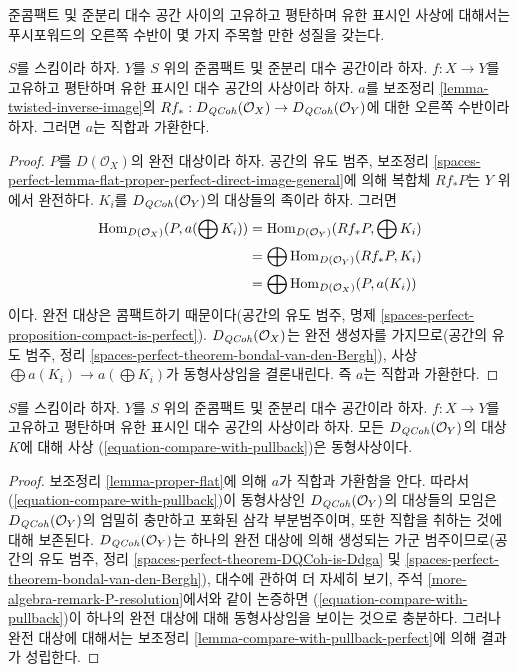 \noindent
준콤팩트 및 준분리 대수 공간 사이의 고유하고 평탄하며 유한 표시인
사상에 대해서는 푸시포워드의 오른쪽 수반이 몇 가지 주목할 만한
성질을 갖는다.

\begin{lemma}
\label{lemma-proper-flat}
$S$를 스킴이라 하자.
$Y$를 $S$ 위의 준콤팩트 및 준분리 대수 공간이라 하자.
$f : X \to Y$를 고유하고 평탄하며 유한 표시인 대수 공간의 사상이라
하자. $a$를 보조정리 \ref{lemma-twisted-inverse-image}의
$Rf_* : D_{\mathit{QCoh}}(\mathcal{O}_X) \to D_{\mathit{QCoh}}(\mathcal{O}_Y)$에 대한
오른쪽 수반이라 하자. 그러면 $a$는 직합과 가환한다.
\end{lemma}

\begin{proof}
$P$를 $D(\mathcal{O}_X)$의 완전 대상이라 하자.
공간의 유도 범주, 보조정리
\ref{spaces-perfect-lemma-flat-proper-perfect-direct-image-general}에
의해 복합체 $Rf_*P$는 $Y$ 위에서 완전하다.
$K_i$를 $D_{\mathit{QCoh}}(\mathcal{O}_Y)$의 대상들의 족이라 하자. 그러면
\begin{align*}
\mathop{\mathrm{Hom}}\nolimits_{D(\mathcal{O}_X)}(P, a(\bigoplus K_i))
& =
\mathop{\mathrm{Hom}}\nolimits_{D(\mathcal{O}_Y)}(Rf_*P, \bigoplus K_i) \\
& =
\bigoplus \mathop{\mathrm{Hom}}\nolimits_{D(\mathcal{O}_Y)}(Rf_*P, K_i) \\
& =
\bigoplus \mathop{\mathrm{Hom}}\nolimits_{D(\mathcal{O}_X)}(P, a(K_i))
\end{align*}
이다. 완전 대상은 콤팩트하기 때문이다(공간의 유도 범주, 명제
\ref{spaces-perfect-proposition-compact-is-perfect}).
$D_{\mathit{QCoh}}(\mathcal{O}_X)$는 완전 생성자를 가지므로(공간의 유도 범주,
정리 \ref{spaces-perfect-theorem-bondal-van-den-Bergh}), 사상
$\bigoplus a(K_i) \to a(\bigoplus K_i)$가 동형사상임을 결론내린다.
즉 $a$는 직합과 가환한다.
\end{proof}

\begin{lemma}
\label{lemma-compare-with-pullback-flat-proper}
$S$를 스킴이라 하자.
$Y$를 $S$ 위의 준콤팩트 및 준분리 대수 공간이라 하자.
$f : X \to Y$를 고유하고 평탄하며 유한 표시인 대수 공간의 사상이라
하자. 모든 $D_{\mathit{QCoh}}(\mathcal{O}_Y)$의 대상 $K$에 대해 사상
(\ref{equation-compare-with-pullback})은 동형사상이다.
\end{lemma}

\begin{proof}
보조정리 \ref{lemma-proper-flat}에 의해 $a$가 직합과 가환함을 안다.
따라서 (\ref{equation-compare-with-pullback})이 동형사상인
$D_{\mathit{QCoh}}(\mathcal{O}_Y)$의 대상들의 모임은
$D_{\mathit{QCoh}}(\mathcal{O}_Y)$의 엄밀히 충만하고 포화된 삼각 부분범주이며,
또한 직합을 취하는 것에 대해 보존된다.
$D_{\mathit{QCoh}}(\mathcal{O}_Y)$는 하나의 완전 대상에 의해 생성되는
가군 범주이므로(공간의 유도 범주, 정리
\ref{spaces-perfect-theorem-DQCoh-is-Ddga} 및
\ref{spaces-perfect-theorem-bondal-van-den-Bergh}),
대수에 관하여 더 자세히 보기, 주석
\ref{more-algebra-remark-P-resolution}에서와 같이 논증하면
(\ref{equation-compare-with-pullback})이 하나의 완전 대상에 대해
동형사상임을 보이는 것으로 충분하다. 그러나 완전 대상에 대해서는
보조정리 \ref{lemma-compare-with-pullback-perfect}에 의해 결과가
성립한다.
\end{proof}

